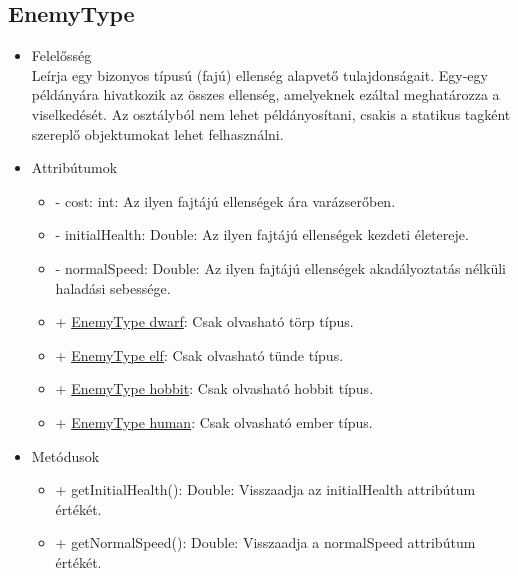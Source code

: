 \subsection{EnemyType}
\begin{itemize}
\item Felelősség\\
Leírja egy bizonyos típusú (fajú) ellenség alapvető tulajdonságait. Egy-egy példányára hivatkozik az összes ellenség, amelyeknek ezáltal meghatározza a viselkedését. Az osztályból nem lehet példányosítani, csakis a statikus tagként szereplő objektumokat lehet felhasználni.
\item Attribútumok
	\begin{itemize}
		\item - cost: int: Az ilyen fajtájú ellenségek ára varázserőben.
		\item - initialHealth: Double: Az ilyen fajtájú ellenségek kezdeti életereje.
		\item - normalSpeed: Double: Az ilyen fajtájú ellenségek akadályoztatás nélküli haladási sebessége.
		\item + \underline{EnemyType dwarf}: Csak olvasható törp típus.
		\item + \underline{EnemyType elf}: Csak olvasható tünde típus.
		\item + \underline{EnemyType hobbit}: Csak olvasható hobbit típus.
		\item + \underline{EnemyType human}: Csak olvasható ember típus.
	\end{itemize}
\item Metódusok
	\begin{itemize}
		\item + getInitialHealth(): Double: Visszaadja az initialHealth attribútum értékét.
		\item + getNormalSpeed(): Double: Visszaadja a normalSpeed attribútum értékét.
	\end{itemize}
\end{itemize}

